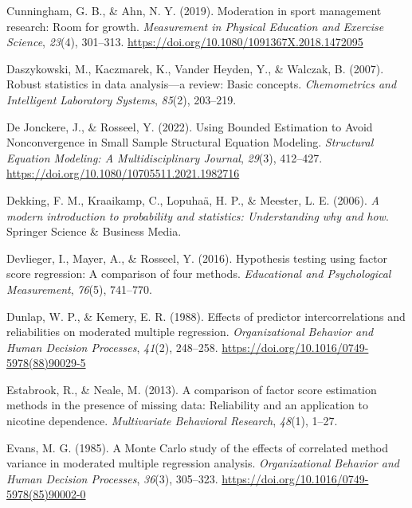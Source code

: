 \documentclass[
  man,mask]{apa6}
\newlength{\cslhangindent}
\newenvironment{CSLReferences}[2] %
 {\begin{list}{}{%
  \setlength{\itemindent}{0pt}
  \setlength{\leftmargin}{0pt}
  \setlength{\parsep}{0pt}
  \ifodd #1
   \setlength{\leftmargin}{\cslhangindent}
   \setlength{\itemindent}{-1\cslhangindent}
  \fi
  \setlength{\itemsep}{#2\baselineskip}}}
 {\end{list}}
\begin{document}
\begin{CSLReferences}{1}{0}
Cunningham, G. B., \& Ahn, N. Y. (2019). Moderation in sport management research: {Room} for growth. \emph{Measurement in Physical Education and Exercise Science}, \emph{23}(4), 301--313. \url{https://doi.org/10.1080/1091367X.2018.1472095}

Daszykowski, M., Kaczmarek, K., Vander Heyden, Y., \& Walczak, B. (2007). Robust statistics in data analysis---a review: Basic concepts. \emph{Chemometrics and Intelligent Laboratory Systems}, \emph{85}(2), 203--219.

De Jonckere, J., \& Rosseel, Y. (2022). Using {Bounded Estimation} to {Avoid Nonconvergence} in {Small Sample Structural Equation Modeling}. \emph{Structural Equation Modeling: A Multidisciplinary Journal}, \emph{29}(3), 412--427. \url{https://doi.org/10.1080/10705511.2021.1982716}

Dekking, F. M., Kraaikamp, C., Lopuhaä, H. P., \& Meester, L. E. (2006). \emph{A modern introduction to probability and statistics: Understanding why and how}. Springer Science \& Business Media.

Devlieger, I., Mayer, A., \& Rosseel, Y. (2016). Hypothesis testing using factor score regression: A comparison of four methods. \emph{Educational and Psychological Measurement}, \emph{76}(5), 741--770.

Dunlap, W. P., \& Kemery, E. R. (1988). Effects of predictor intercorrelations and reliabilities on moderated multiple regression. \emph{Organizational Behavior and Human Decision Processes}, \emph{41}(2), 248--258. \url{https://doi.org/10.1016/0749-5978(88)90029-5}

Estabrook, R., \& Neale, M. (2013). A comparison of factor score estimation methods in the presence of missing data: Reliability and an application to nicotine dependence. \emph{Multivariate Behavioral Research}, \emph{48}(1), 1--27.

Evans, M. G. (1985). A {Monte Carlo} study of the effects of correlated method variance in moderated multiple regression analysis. \emph{Organizational Behavior and Human Decision Processes}, \emph{36}(3), 305--323. \url{https://doi.org/10.1016/0749-5978(85)90002-0}


\end{CSLReferences}
\end{document}
